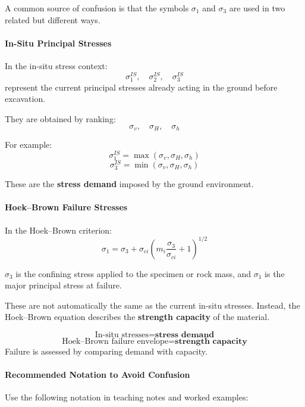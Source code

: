 A common source of confusion is that the symbols \(\sigma_1\) and \(\sigma_3\) are used
in two related but different ways.

\paragraph{In-Situ Principal Stresses}

In the in-situ stress context:
\[
\sigma_1^{IS},\quad \sigma_2^{IS},\quad \sigma_3^{IS}
\]
represent the current principal stresses already acting in the ground before excavation.

They are obtained by ranking:
\[
\sigma_v,\quad \sigma_H,\quad \sigma_h
\]

For example:
\[
\sigma_1^{IS} = \max(\sigma_v,\sigma_H,\sigma_h)
\]
\[
\sigma_3^{IS} = \min(\sigma_v,\sigma_H,\sigma_h)
\]

These are the \textbf{stress demand} imposed by the ground environment.

\paragraph{Hoek--Brown Failure Stresses}

In the Hoek--Brown criterion:
\[
\sigma_1 =
\sigma_3 + \sigma_{ci}
\left(
m_i\frac{\sigma_3}{\sigma_{ci}} + 1
\right)^{1/2}
\]

\(\sigma_3\) is the confining stress applied to the specimen or rock mass, and
\(\sigma_1\) is the major principal stress at failure.

These are not automatically the same as the current in-situ stresses. Instead, the
Hoek--Brown equation describes the \textbf{strength capacity} of the material.

\begin{keybox}
\[
\text{In-situ stresses} = \textbf{stress demand}
\]
\[
\text{Hoek--Brown failure envelope} = \textbf{strength capacity}
\]
Failure is assessed by comparing demand with capacity.
\end{keybox}

\paragraph{Recommended Notation to Avoid Confusion}

Use the following notation in teaching notes and worked examples:

